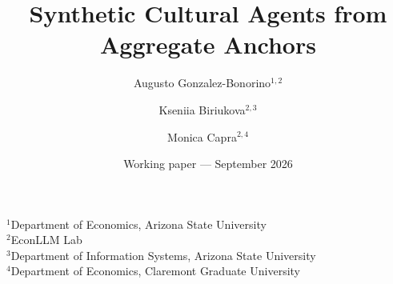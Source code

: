 \documentclass[11pt]{article}
\title{Synthetic Cultural Agents from Aggregate Anchors}
\author{Augusto Gonzalez-Bonorino$^{1,2}$ \and Kseniia Biriukova$^{2,3}$ \and Monica Capra$^{2,4}$}
\date{Working paper --- September 2026}
\begin{document}
\maketitle
\begin{center}\small
$^1$Department of Economics, Arizona State University\\
$^2$EconLLM Lab\\
$^3$Department of Information Systems, Arizona State University\\
$^4$Department of Economics, Claremont Graduate University
\end{center}










\clearpage

\end{document}
